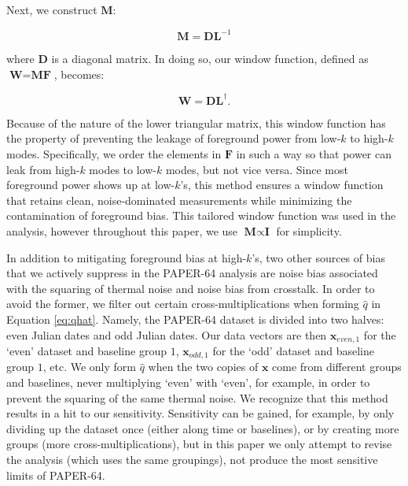 \documentclass[preprint2,numberedappendix,tighten]{aastex6}  %
\begin{document}
\noindent Next, we construct $\textbf{M}$:

\begin{equation}
\textbf{M} = \textbf{DL}^{-1}
\end{equation}

\noindent where $\textbf{D}$ is a diagonal matrix. In doing so, our window function, defined as $\textbf{W} = \textbf{MF}$, 
becomes:

\begin{equation}
\textbf{W} = \textbf{DL}^{\dagger}.
\end{equation}

\noindent Because of the nature of the lower triangular matrix, this window function has the property of preventing the leakage 
of foreground power from low-$k$ to high-$k$ modes. Specifically, we order the elements in $\textbf{F}$ in such a way so that 
power can leak from high-$k$ modes to low-$k$ modes, but not vice versa. Since most foreground power shows up at low-$k$'s, this method ensures a window function that retains clean, noise-dominated measurements while minimizing the 
contamination of foreground bias. This tailored window function was used in the  analysis, however throughout this paper, we use $\textbf{M} \propto \textbf{I}$ for simplicity.

In addition to mitigating foreground bias at high-$k$'s, two other sources of bias that we actively suppress in the PAPER-64 
analysis are noise bias associated with the squaring of thermal noise and noise bias from crosstalk. In order to avoid the 
former, we filter out certain cross-multiplications when forming $\widehat{q}$ in Equation \eqref{eq:qhat}. Namely, the PAPER-64 
dataset is divided into two halves: even Julian dates and odd Julian dates. Our data vectors are then $\textbf{x}_{even, 1}$ for 
the `even' dataset and baseline group $1$, $\textbf{x}_{odd, 1}$ for the `odd' dataset and baseline group $1$, etc. We only form 
$\widehat{q}$ when the two copies of $\textbf{x}$ come from different groups and baselines, never multiplying `even' with `even', for 
example, in order to prevent the squaring of the same thermal noise. We recognize that this method results in a hit to our sensitivity. Sensitivity can be gained, for example, by only dividing up the dataset once (either along time or baselines), or by creating more groups (more cross-multiplications), but in this paper we only attempt to revise the  analysis (which uses the same groupings), not produce the most sensitive limits of PAPER-64.
\end{document}
